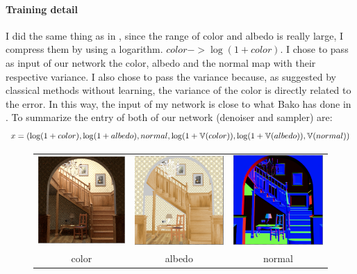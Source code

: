 \documentclass{classeENS}
\begin{document}
\paragraph*{Training detail} I did the same thing as in \cite{kuznetsov2018deep}, since the range of color and albedo
is really large, I compress them by using a logarithm. $color -> \log(1+color)$. I chose to pass
as input of our network the color, albedo and the normal map with their respective variance. I also chose to 
pass the variance because, as suggested by classical methods without learning, the variance of 
the color is directly related to the error. In this way, the input 
of my network is close to what Bako has done in
\cite{10.1145/3072959.3073708}.
To summarize the entry of both of our network (denoiser and sampler) are:
\[x = (\log(1+color), \log(1+albedo), normal, \log(1+\mathbb V(color)), \log(1+\mathbb V(albedo)),  \mathbb V(normal)) \]
\begin{figure}[H]
    \centering
    \begin{tabular}{ccc}
    \includegraphics[width=45mm]{image/networkInput/color.png}
    & \includegraphics[width=45mm]{image/networkInput/albedo.png}
    & \includegraphics[width=45mm]{image/networkInput/normal.png} \\
    color & albedo & normal\\
\end{tabular}
\end{figure}
\end{document}
